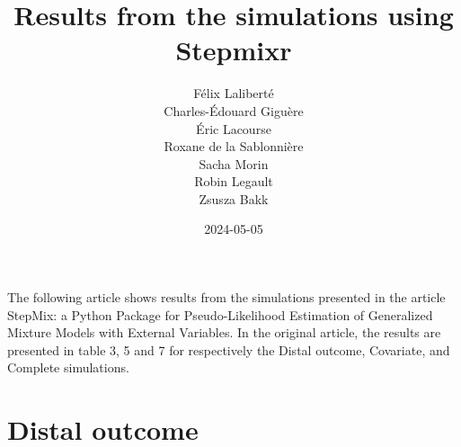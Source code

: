 \documentclass{article}
\begin{document}
\title{Results from the simulations using Stepmixr}
\author{Félix Laliberté \\ Charles-Édouard Giguère \\ Éric Lacourse \\ Roxane de la
  Sablonnière \\Sacha Morin \\Robin Legault\\ Zsusza Bakk}
\date{2024-05-05}

\maketitle

The following article shows results from the simulations presented in the article
StepMix: a Python Package for Pseudo-Likelihood Estimation of Generalized Mixture
Models with External Variables. In the original article, the results are presented
in table 3, 5 and 7 for respectively the Distal outcome, Covariate, and Complete
simulations. 

\newpage
\section{Distal outcome}
\end{document}
